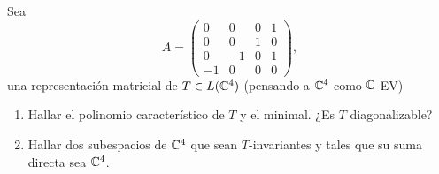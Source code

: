 \item Sea \[A=\begin{pmatrix}
        0&0&0&1\\0&0&1&0\\0&-1&0&1\\-1&0&0&0
    \end{pmatrix},\]
    una representación matricial de $T\in L(\mathbb{C}^4)$ (pensando a $\mathbb{C}^4$ como $\mathbb{C}$-EV)
    \begin{enumerate}
        \item Hallar el polinomio característico de $T$ y el minimal. ¿Es $T$ diagonalizable?
            \begin{mdframed}[style=s]
                
            \end{mdframed}
        \item Hallar dos subespacios de $\mathbb{C}^4$ que sean $T$-invariantes y tales que su suma directa sea $\mathbb{C}^4$.
            \begin{mdframed}[style=s]
                
            \end{mdframed}
    \end{enumerate}